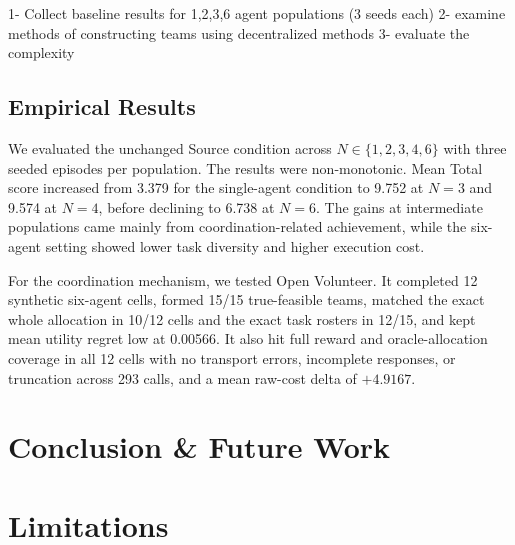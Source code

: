 1- Collect baseline results for 1,2,3,6 agent populations (3 seeds each)
2- examine methods of constructing teams using decentralized methods
3- evaluate the complexity 



\subsection{Empirical Results}

We evaluated the unchanged Source condition across $N \in \{1,2,3,4,6\}$ with three seeded episodes per population. The results were non-monotonic. Mean Total score increased from 3.379 for the single-agent condition to 9.752 at $N=3$ and 9.574 at $N=4$, before declining to 6.738 at $N=6$. The gains at intermediate populations came mainly from coordination-related achievement, while the six-agent setting showed lower task diversity and higher execution cost.

For the coordination mechanism, we tested Open Volunteer. It completed 12 synthetic six-agent cells, formed 15/15 true-feasible teams, matched the exact whole allocation in 10/12 cells and the exact task rosters in 12/15, and kept mean utility regret low at 0.00566. It also hit full reward and oracle-allocation coverage in all 12 cells with no transport errors, incomplete responses, or truncation across 293 calls, and a mean raw-cost delta of $+4.9167$. 

\begin{table}[t]
\centering
\small
{}
\caption{Population means for the completed Source population screen. Base, Coordination, and Total are reward-weighted paper scores on a 0--100 scale. Coordination is undefined for the single-agent condition.}
\label{tab:population-means}
\end{table}





\section{Conclusion \& Future Work}

\section{Limitations}